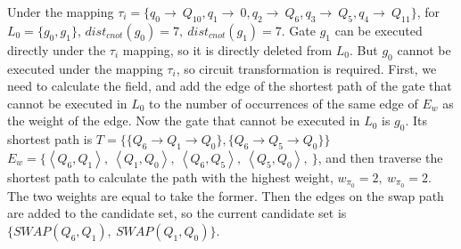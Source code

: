 \documentclass[runningheads]{llncs}
\begin{document}
\begin{example}
	Under the mapping $\tau_{i}=\{q_{0}\rightarrow \ Q_{10},q_{1}\rightarrow \ 0,
q_{2}\rightarrow \ Q_{6},q_{3}\rightarrow \ Q_{5},q_{4}\rightarrow \ Q_{11}\}$, 
for $L_{0}=\{g_{0},g_{1}\}$, $dist_{cnot}(g_{0})=7,\ dist_{cnot}(g_{1})=7$. 
Gate $g_{1}$ can be executed directly under the $\tau_{i}$ mapping, so it is directly deleted from $L_{0}$.
But $g_{0}$ cannot be executed under the mapping $\tau_{i}$, 
so circuit transformation is required. 
First, we need to calculate the field, 
and add the edge of the shortest path of the gate that cannot be executed in 
$L_{0}$ to the number of occurrences of the same edge of $E_{w}$ as the weight of the edge.
Now the gate that cannot be executed in $L_{0}$ is $g_{0}$. 
Its shortest path is $T=\{\{Q_{6}\rightarrow Q_{1} \rightarrow Q_{0} \},\{Q_{6}\rightarrow Q_{5} \rightarrow Q_{0} \}\}$
$E_{w}=\{\left \langle Q_{6},Q_{1}\right \rangle,\ \left \langle Q_{1},Q_{0}\right \rangle,\ 
\left \langle Q_{6},Q_{5}\right \rangle,\ \left \langle Q_{5},Q_{0}\right \rangle,\ 
\}$, and then traverse the shortest path to calculate the path with the highest weight, 
$w_{\pi_{0}}=2, \ w_{\pi_{0}}=2$. The two weights are equal to take the former.
Then the edges on the swap path are added to the candidate set, 
so the current candidate set is $\{SWAP(Q_{6},Q_{1}),\ SWAP(Q_{1},Q_{0}) \}$.
\end{example}
\end{document}
